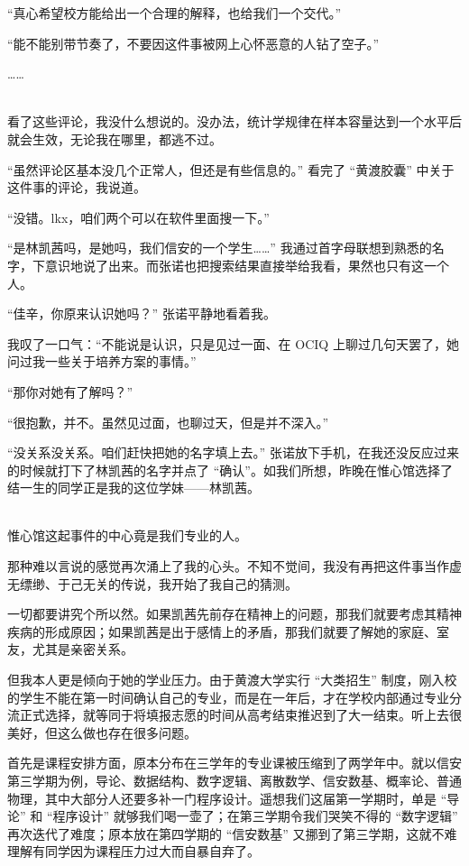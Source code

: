\documentclass[UTF8]{ctexart}
\begin{document}
“真心希望校方能给出一个合理的解释，也给我们一个交代。”

“能不能别带节奏了，不要因这件事被网上心怀恶意的人钻了空子。”

……

~\\

看了这些评论，我没什么想说的。没办法，统计学规律在样本容量达到一个水平后就会生效，无论我在哪里，都逃不过。

“虽然评论区基本没几个正常人，但还是有些信息的。” 看完了 “黄渡胶囊” 中关于这件事的评论，我说道。

“没错。lkx，咱们两个可以在软件里面搜一下。”

“是林凯茜吗，是她吗，我们信安的一个学生……” 我通过首字母联想到熟悉的名字，下意识地说了出来。而张诺也把搜索结果直接举给我看，果然也只有这一个人。

“佳辛，你原来认识她吗？” 张诺平静地看着我。

我叹了一口气：“不能说是认识，只是见过一面、在 OCIQ 上聊过几句天罢了，她问过我一些关于培养方案的事情。”

“那你对她有了解吗？”

“很抱歉，并不。虽然见过面，也聊过天，但是并不深入。”

“没关系没关系。咱们赶快把她的名字填上去。” 张诺放下手机，在我还没反应过来的时候就打下了林凯茜的名字并点了 “确认”。如我们所想，昨晚在惟心馆选择了结一生的同学正是我的这位学妹——林凯茜。

~\\

惟心馆这起事件的中心竟是我们专业的人。

那种难以言说的感觉再次涌上了我的心头。不知不觉间，我没有再把这件事当作虚无缥缈、于己无关的传说，我开始了我自己的猜测。

一切都要讲究个所以然。如果凯茜先前存在精神上的问题，那我们就要考虑其精神疾病的形成原因；如果凯茜是出于感情上的矛盾，那我们就要了解她的家庭、室友，尤其是亲密关系。

但我本人更是倾向于她的学业压力。由于黄渡大学实行 “大类招生” 制度，刚入校的学生不能在第一时间确认自己的专业，而是在一年后，才在学校内部通过专业分流正式选择，就等同于将填报志愿的时间从高考结束推迟到了大一结束。听上去很美好，但这么做也存在很多问题。

首先是课程安排方面，原本分布在三学年的专业课被压缩到了两学年中。就以信安第三学期为例，导论、数据结构、数字逻辑、离散数学、信安数基、概率论、普通物理，其中大部分人还要多补一门程序设计。遥想我们这届第一学期时，单是 “导论” 和 “程序设计” 就够我们喝一壶了；在第三学期令我们哭笑不得的 “数字逻辑” 再次迭代了难度；原本放在第四学期的 “信安数基” 又挪到了第三学期，这就不难理解有同学因为课程压力过大而自暴自弃了。
\end{document}
